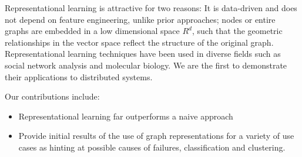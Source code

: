 Representational learning is attractive for two reasons: It is data-driven and does not depend on feature engineering, unlike prior approaches; nodes or entire graphs are embedded in a low dimensional space $R^{d}$, such that the geometric relationships in the vector space reflect the structure of the original graph. Representational learning techniques have been used in diverse fields such as social network analysis and molecular biology. We are the first to demonstrate their applications to distributed systems. 

Our contributions include:
\begin{itemize}
\item Representational learning far outperforms a naive approach 
\item Provide initial results of the use of graph representations for a variety of use cases as hinting at possible causes of failures, classification and clustering.
\end{itemize}


